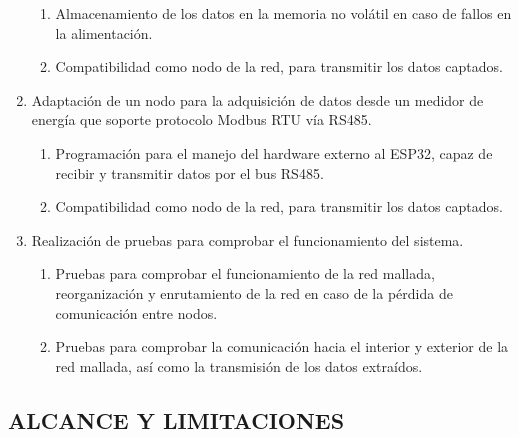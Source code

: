 \documentclass[12pt,letterpaper]{article}
\begin{document}
\begin{enumerate}[1.]
\begin{enumerate}
		\item Almacenamiento de los datos en la memoria no volátil en caso de fallos en la alimentación.
		
		\item Compatibilidad como nodo de la red, para transmitir los datos captados.
		
	\end{enumerate}
	
	
	\item Adaptación de un nodo para la adquisición de datos desde un medidor de energía que soporte protocolo Modbus RTU vía RS485. 

	
	\begin{enumerate}
				
		\item Programación para el manejo del hardware externo al ESP32, capaz de recibir y transmitir datos por el bus RS485.
		
		\item Compatibilidad como nodo de la red, para transmitir los datos captados.
		
	\end{enumerate}


	
	\item Realización de pruebas para comprobar el funcionamiento del sistema.
	
	
	\begin{enumerate}
		
		\item Pruebas para comprobar el funcionamiento de la red mallada, reorganización y enrutamiento de la red en caso de la pérdida de comunicación entre nodos.
		
		\item Pruebas para comprobar la comunicación hacia el interior y exterior de la red mallada, así como la transmisión de los datos extraídos.
		
	\end{enumerate}
	
	
	
	
	
\end{enumerate}
	
	
\newpage
	
	
		\begin{center}
		
		\section*{ ALCANCE Y LIMITACIONES}	
	\end{center}
	
\end{document}
